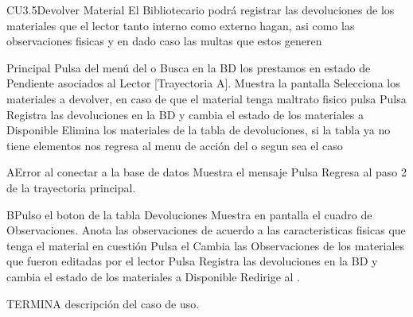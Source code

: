 
	\begin{UseCase}{CU3.5}{Devolver Material}{
		El Bibliotecario podrá registrar las devoluciones de los materiales que el lector tanto interno como externo hagan, asi como las observaciones fisicas y en dado caso las multas que estos generen
		}
	\end{UseCase}
		\begin{UCtrayectoria}{Principal}
		\UCpaso[\UCactor] Pulsa  del menú del  o 
		\UCpaso[\UCsist] Busca en la BD los prestamos en estado de Pendiente asociados al Lector [Trayectoria A].
		\UCpaso[\UCsist] Muestra la pantalla 
		\UCpaso[\UCactor] Selecciona los materiales a devolver, en caso de que el material tenga maltrato fisico pulsa  
		\UCpaso[\UCactor] Pulsa 
		\UCpaso[\UCsist] Registra las devoluciones en la BD y cambia el estado de los materiales a Disponible
		\UCpaso[\UCsist] Elimina los materiales de la tabla de devoluciones, si la tabla ya no tiene elementos nos regresa al menu de acción del  o  segun sea el caso
			\end{UCtrayectoria}
			
		\begin{UCtrayectoriaA}{A}{Error al conectar a la base de datos}
			\UCpaso[\UCsist] Muestra el mensaje 
			\UCpaso[\UCactor] Pulsa 
			\UCpaso[\UCsist] Regresa al paso 2 de la trayectoria principal.
		\end{UCtrayectoriaA}
		\begin{UCtrayectoriaA}{B}{Pulso el boton  de la tabla Devoluciones}
			\UCpaso[\UCsist] Muestra en pantalla el cuadro de Observaciones.
			\UCpaso[\UCactor] Anota las observaciones de acuerdo a las caracteristicas fisicas que tenga el material en cuestión
			\UCpaso[\UCsist] Pulsa el 
			\UCpaso[\UCsist] Cambia las Observaciones de los materiales que fueron editadas por el lector
			\UCpaso[\UCactor] Pulsa 
			\UCpaso[\UCsist] Registra las devoluciones en la BD y cambia el estado de los materiales a Disponible
			\UCpaso[\UCsist]	Redirige al .
		\end{UCtrayectoriaA}
		TERMINA descripción del caso de uso.


